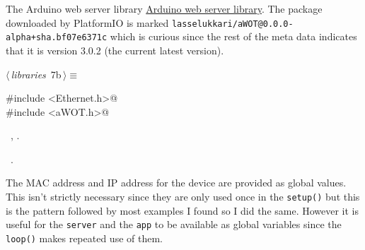 \documentclass[a4paper, 11pt]{article}
\begin{document}
The Arduino web server library \href{https://github.com/lasselukkari/awot}{Arduino web server library}.
The package downloaded by PlatformIO is marked
\verb|lasselukkari/aWOT@0.0.0-alpha+sha.bf07e6371c|
which is curious since the rest of the meta data indicates that it is version 3.0.2
(the current latest version).

\begin{flushleft} \small
\begin{minipage}{\linewidth}\label{scrap7}\raggedright\small
{}$\langle\,${\itshape libraries}\nobreak\ {\footnotesize{7b}}$\,\rangle\equiv$
\vspace{-1ex}
\begin{list}{}{\setlength{\leftmargin}{1em}} \item
\mbox{}\lstinline@#include <Ethernet.h>@\\
\mbox{}\lstinline@#include <aWOT.h>@\\
\mbox{}{\NWsep}
\end{list}
\vspace{-1ex}
\vspace{-1ex}
\footnotesize
\begin{list}{}{\setlength{\itemsep}{-\parsep}\setlength{\itemindent}{-\leftmargin}}
\item \NWtxtMacroDefBy\ , .
\item \NWtxtMacroRefIn\ .
\end{list}
\end{minipage}
\end{flushleft}

The MAC address and IP address for the device
are provided as global values.
This isn't strictly necessary since they are only used once in the \verb|setup()|
but this is the pattern followed by most examples I found so I did the same.
However it is useful for the \verb|server| and the \verb|app| to be available
as global variables since the \verb|loop()| makes repeated use of them.
\end{document}
